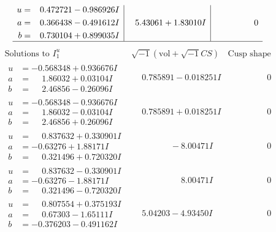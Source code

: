 \documentclass[1p]{elsarticle_modified}
\theoremstyle{definition}
\newcommand{\I}{\sqrt{-1}}
\begin{document}
$$\begin{array}{c|c|c}
\begin{aligned}
u &= \phantom{-}0.472721 - 0.986926 I \\
a &= \phantom{-}0.366438 - 0.491612 I \\
b &= \phantom{-}0.730104 + 0.899035 I\end{aligned}
 & \phantom{-}5.43061 + 1.83010 I & \phantom{-0.000000 } 0\\
 \hline 
 \end{array}$$\newpage$$\begin{array}{c|c|c}  
\text{Solutions to }I^u_{1}& \I (\text{vol} + \sqrt{-1}CS) & \text{Cusp shape}\\
 \hline 
\begin{aligned}
u &= -0.568348 + 0.936676 I \\
a &= \phantom{-}1.86032 + 0.03104 I \\
b &= \phantom{-}2.46856 - 0.26096 I\end{aligned}
 & \phantom{-}0.785891 - 0.018251 I & \phantom{-0.000000 } 0 \\ \hline\begin{aligned}
u &= -0.568348 - 0.936676 I \\
a &= \phantom{-}1.86032 - 0.03104 I \\
b &= \phantom{-}2.46856 + 0.26096 I\end{aligned}
 & \phantom{-}0.785891 + 0.018251 I & \phantom{-0.000000 } 0 \\ \hline\begin{aligned}
u &= \phantom{-}0.837632 + 0.330901 I \\
a &= -0.63276 + 1.88171 I \\
b &= \phantom{-}0.321496 + 0.720320 I\end{aligned}
 & \phantom{-0.000000 } -8.00471 I & \phantom{-0.000000 } 0 \\ \hline\begin{aligned}
u &= \phantom{-}0.837632 - 0.330901 I \\
a &= -0.63276 - 1.88171 I \\
b &= \phantom{-}0.321496 - 0.720320 I\end{aligned}
 & \phantom{-0.000000 -}8.00471 I & \phantom{-0.000000 } 0 \\ \hline\begin{aligned}
u &= \phantom{-}0.807554 + 0.375193 I \\
a &= \phantom{-}0.67303 - 1.65111 I \\
b &= -0.376203 - 0.491162 I\end{aligned}
 & \phantom{-}5.04203 - 4.93450 I & \phantom{-0.000000 } 0 \\ \hline\begin{aligned}

\end{aligned}
\end{array}$$
\end{document}
